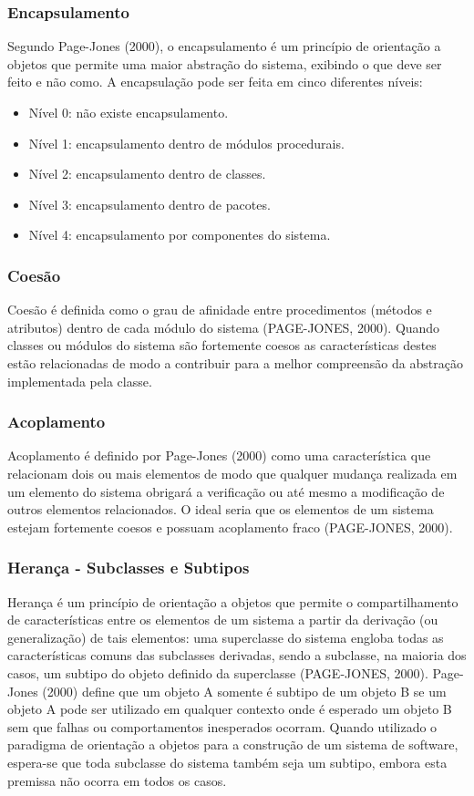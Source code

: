 \subsubsection{Encapsulamento}
Segundo Page-Jones (2000), o encapsulamento é um princípio de orientação a objetos que permite uma maior abstração do sistema, exibindo o que deve ser feito e não como. A encapsulação pode ser feita em cinco diferentes níveis:
\begin{itemize}
	\item Nível 0: não existe encapsulamento.
	\item Nível 1: encapsulamento dentro de módulos procedurais.
	\item Nível 2: encapsulamento dentro de classes.
	\item Nível 3: encapsulamento dentro de pacotes.
	\item Nível 4: encapsulamento por componentes do sistema.
\end{itemize}

\subsubsection{Coesão}
Coesão é definida como o grau de afinidade entre procedimentos (métodos e atributos) dentro de cada módulo do sistema (PAGE-JONES, 2000). Quando classes ou módulos do sistema são fortemente coesos as características destes estão relacionadas de modo a contribuir para a melhor compreensão da abstração implementada pela classe.

\subsubsection{Acoplamento}
Acoplamento é definido por Page-Jones (2000) como uma característica que relacionam dois ou mais elementos de modo que qualquer mudança realizada em um elemento do sistema obrigará a verificação ou até mesmo a modificação de outros elementos relacionados.
O ideal seria que os elementos de um sistema estejam fortemente coesos e possuam acoplamento fraco (PAGE-JONES, 2000).

\subsubsection{Herança - Subclasses e Subtipos}
Herança é um princípio de orientação a objetos que permite o compartilhamento de características entre os elementos de um sistema a partir da derivação (ou generalização) de tais elementos: uma superclasse do sistema engloba todas as características comuns das subclasses derivadas, sendo a subclasse, na maioria dos casos, um subtipo do objeto definido da superclasse (PAGE-JONES, 2000).
Page-Jones (2000) define que um objeto A somente é subtipo de um objeto B se um objeto A pode ser utilizado em qualquer contexto onde é esperado um objeto B sem que falhas ou comportamentos inesperados ocorram. Quando utilizado o paradigma de orientação a objetos para a construção de um sistema de software, espera-se que toda subclasse do sistema também seja um subtipo, embora esta premissa não ocorra em todos os casos.

